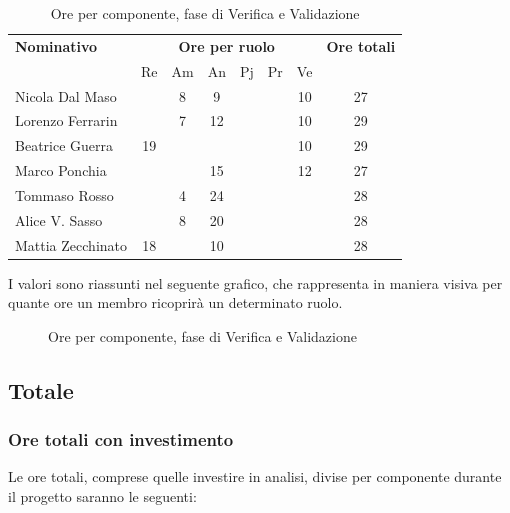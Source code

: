 \begin{table}[H]
	\centering
	\begin{tabular}{|l|c|c|c|c|c|c|c|}
		\hline
		\textbf{Nominativo} & 
		\multicolumn{6}{c|}{\textbf{Ore per ruolo}} & 
		\textbf{Ore totali} \\
		& Re & Am & An & Pj & Pr & Ve & \\
		\hline
		Nicola Dal Maso & & 8 & 9 & & & 10 & 27 \\
		Lorenzo Ferrarin & & 7 & 12 & & & 10 & 29 \\
		Beatrice Guerra & 19 & & & & & 10 & 29 \\
		Marco Ponchia & & & 15 & & & 12 & 27 \\
		Tommaso Rosso & & 4 & 24 & & & & 28 \\
		Alice V. Sasso & & 8 & 20 & & & & 28 \\
		Mattia Zecchinato & 18 & & 10 & & & & 28 \\
		\hline
	\end{tabular}
	\caption{Ore per componente, fase di Verifica e Validazione}
\end{table}
I valori sono riassunti nel seguente grafico, che rappresenta in maniera visiva per quante ore un membro ricoprirà un determinato ruolo.
\begin{figure}[H]
	\centering
	\caption{Ore per componente, fase di Verifica e Validazione}
\end{figure}

\subsection{Totale}
\subsubsection{Ore totali con investimento}
Le ore totali, comprese quelle investire in analisi, divise per componente durante il progetto saranno le seguenti:

